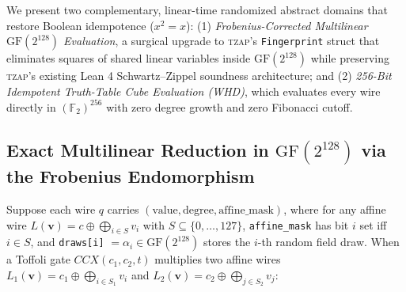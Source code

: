 \documentclass[11pt,a4paper]{article}
\theoremstyle{definition}
\begin{document}
We present two complementary, linear-time randomized abstract domains that restore Boolean idempotence ($x^2 = x$):
(1) \emph{Frobenius-Corrected Multilinear $\mathrm{GF}(2^{128})$ Evaluation}, a surgical upgrade to \textsc{tzap}'s \texttt{Fingerprint} struct that eliminates squares of shared linear variables inside $\mathrm{GF}(2^{128})$ while preserving \textsc{tzap}'s existing Lean 4 Schwartz--Zippel soundness architecture; and
(2) \emph{256-Bit Idempotent Truth-Table Cube Evaluation (\textsc{WHD})}, which evaluates every wire directly in $(\mathbb{F}_2)^{256}$ with zero degree growth and zero Fibonacci cutoff.

\subsection{Exact Multilinear Reduction in $\mathrm{GF}(2^{128})$ via the Frobenius Endomorphism}

Suppose each wire $q$ carries $(\mathrm{value}, \mathrm{degree}, \mathrm{affine\_mask})$, where for any affine wire $L(\mathbf{v}) = c \oplus \bigoplus_{i \in S} v_i$ with $S \subseteq \{0, \dots, 127\}$, \texttt{affine\_mask} has bit $i$ set iff $i \in S$, and \texttt{draws[i]} $= \alpha_i \in \mathrm{GF}(2^{128})$ stores the $i$-th random field draw. When a Toffoli gate $\mathit{CCX}(c_1, c_2, t)$ multiplies two affine wires $L_1(\mathbf{v}) = c_1 \oplus \bigoplus_{i \in S_1} v_i$ and $L_2(\mathbf{v}) = c_2 \oplus \bigoplus_{j \in S_2} v_j$:
\end{document}
